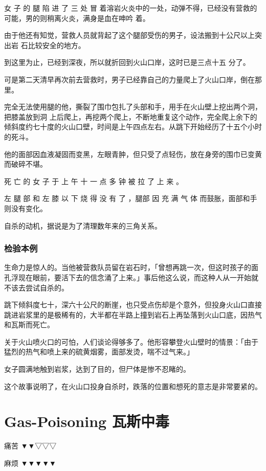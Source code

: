 \documentclass[UTF8]{ctexart}
\begin{document}
女 子 的 腿 陷 进 了 三 处 冒 着溶岩火炎中的一处，动弹不得，已经没有营救的可能，男的则稍离火炎，满身是血在呻吟 着。

由于他还有知觉，营救人员就背起了这个腿部受伤的男子，设法搬到十公尺以上突出岩 石比较安全的地方。

到这里为止，已经到深夜，所以就折回到火山口岸，这时已是三点十五 分了。

可是第二天清早再次前去营救时，男子已经靠自己的力量爬上了火山口岸，倒在那里。

完全无法使用腿的他，撕裂了围巾包扎了头部和手，用手在火山壁上挖出两个洞，把膝盖放到洞 上后爬上，再挖两个爬上，不断地重复这个动作，完全爬上余下的倾斜度约七十度的火山口壁，时间是上午四点左右。从跳下开始经历了十五个小时的死斗。

他的面部因血液凝固而变黑，左眼青肿，但只受了点轻伤，放在身旁的围巾已变黄而破碎不堪。 

死 亡 的 女 子 于 上 午 十 一 点 多 钟 被 拉 了 上 来 。

左 腿 部 和 左 膝 以 下 烧 得 没 有 了 ，腿部 因 充 满 气 体 而鼓胀，面部和手则没有变化。

自杀的动机，据说是为了清理数年来的三角关系。

\subsubsection*{检验本例}

生命力是惊人的。当他被营救队员留在岩石时，「曾想再跳一次，但这时孩子的面孔浮现在眼前，要活下去的信念涌了上来。」事后他这么说，而这种人从一开始就不该去尝试自杀的。

跳下倾斜度七十，深六十公尺的断崖，也只受点伤却是个意外，但投身火山口直接跳进岩浆里的是极稀有的，大半都在半路上撞到岩石上再坠落到火山口底，因热气和瓦斯而死亡。

关于火山喷火口的可怕，人们谈论得够多了。他形容攀登火山壁时的情景：「由于猛烈的热气和喷上来的硫黄烟雾，面部发烫，喘不过气来。」

女子圆满地触到岩浆，达到了目的，但尸体是惨不忍睹的。

这个故事说明了，在火山口投身自杀时，跌落的位置和想死的意志是非常要紧的。

\newpage

\section{Gas-Poisoning 瓦斯中毒}

痛苦 ▼▼▽▽▽

麻烦 ▼▼▼▼▼
\end{document}
